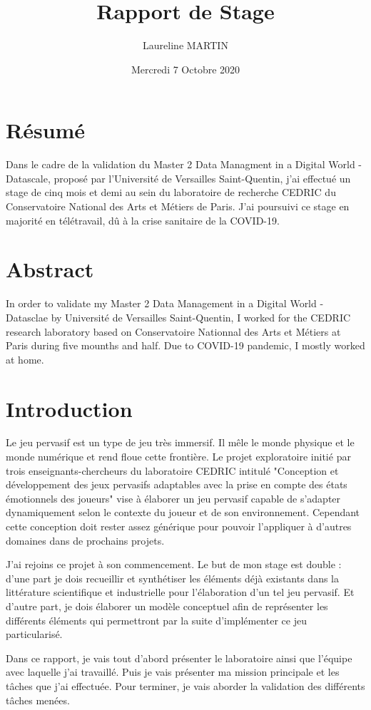 \documentclass{article}
\title{Rapport de Stage}
\author{Laureline MARTIN}
\date{Mercredi 7 Octobre 2020}
\begin{document}
\maketitle

\newpage
\renewcommand{\contentsname}{Table des matières}\tableofcontents

\newpage
\section{Résumé}
	Dans le cadre de la validation du Master 2 Data Managment in a Digital World - Datascale, proposé par l'Université de Versailles Saint-Quentin, j'ai effectué un stage de cinq mois et demi au sein du laboratoire de recherche CEDRIC du Conservatoire National des Arts et Métiers de Paris.
	J'ai poursuivi ce stage en majorité en télétravail, dû à la crise sanitaire de la COVID-19.

\section{Abstract}
	In order to validate my Master 2 Data Management in a Digital World - Datasclae by Université de Versailles Saint-Quentin, I worked for the CEDRIC research laboratory based on Conservatoire Nationnal des Arts et Métiers at Paris during five mounths and half.
	Due to COVID-19 pandemic, I mostly worked at home.

\section{Introduction}
	Le jeu pervasif est un type de jeu très immersif. 
	Il mêle le monde physique et le monde numérique et rend floue cette frontière. 
	Le projet exploratoire initié par trois enseignants-chercheurs du laboratoire CEDRIC intitulé "Conception et développement des jeux pervasifs adaptables avec la prise en compte des états émotionnels des joueurs" vise à élaborer un jeu pervasif capable de s'adapter dynamiquement selon le contexte du joueur et de son environnement. Cependant cette conception doit rester assez générique pour pouvoir l'appliquer à d'autres domaines dans de prochains projets.\par
	J'ai rejoins ce projet à son commencement. Le but de mon stage est double : d'une part je dois recueillir et synthétiser les éléments déjà existants dans la littérature scientifique et industrielle pour l'élaboration d'un tel jeu pervasif. 
	Et d'autre part, je dois élaborer un modèle conceptuel afin de représenter les différents éléments qui permettront par la suite d'implémenter ce jeu particularisé.\par
	Dans ce rapport, je vais tout d'abord présenter le laboratoire ainsi que l'équipe avec laquelle j'ai travaillé. Puis je vais présenter ma mission principale et les tâches que j'ai effectuée.
	Pour terminer, je vais aborder la validation des différents tâches menées.
\end{document}
